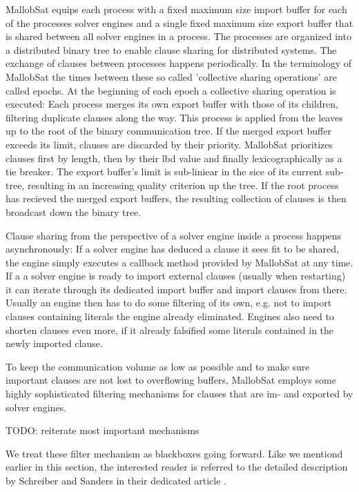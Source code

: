 \documentclass[12pt,a4paper,twoside]{scrartcl}
\numberwithin{equation}{section}
\begin{document}
MallobSat equips each process with a fixed maximum size import buffer for each of the processes solver engines and a single fixed maximum size export buffer that is shared between all solver engines in a process. The processes are organized into a distributed binary tree to enable clause sharing for distributed systems. The exchange of clauses between processes happens periodically. In the terminology of MallobSat the times between these so called 'collective sharing operations' are called epochs. At the beginning of each epoch a collective sharing operation is executed: Each process merges its own export buffer with those of its children, filtering duplicate clauses along the way. This process is applied from the leaves up to the root of the binary communication tree. If the merged export buffer exceeds its limit, clauses are discarded by their priority. MallobSat prioritizes clauses first by length, then by their lbd value and finally lexicographically as a tie breaker. The export buffer's limit is sub-liniear in the sice of its current sub-tree, resulting in an increasing quality criterion up the tree. If the root process has recieved the merged export buffers, the resulting collection of clauses is then broadcast down the binary tree.

Clause sharing from the perspective of a solver engine inside a process happens asynchronously: If a solver engine has deduced a clause it sees fit to be shared, the engine simply executes a callback method provided by MallobSat at any time. If a a solver engine is ready to import external clauses (usually when restarting) it can iterate through its dedicated import buffer and import clauses from there. Usually an engine then has to do some filtering of its own, e.g. not to import clauses containing literals the engine already eliminated. Engines also need to shorten clauses even more, if it already falsified some literals contained in the newly imported clause.

To keep the communication volume as low as possible and to make sure important clauses are not lost to overflowing buffers, MallobSat employs some highly sophisticated filtering mechanisms for clauses that are im- and exported by solver engines. 

TODO: reiterate most important mechanisms

We treat these filter mechanism as blackboxes going forward. Like we mentiond earlier in this section, the interested reader is referred to the detailed description by Schreiber and Sanders in their dedicated article \cite{mallobSat}.
\end{document}
